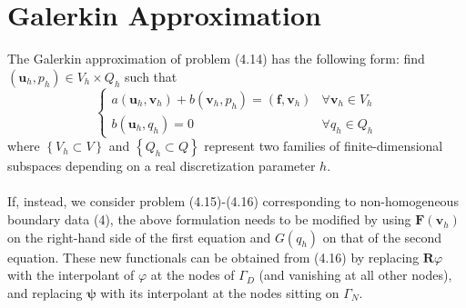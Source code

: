 \documentclass[11pt]{book}
\begin{document}
\section{Galerkin Approximation}
The Galerkin approximation of problem (4.14) has the following form: find $\left(\mathbf{u}_{h}, p_{h}\right) \in V_{h} \times Q_{h}$ such that
\begin{equation}
\begin{cases}a\left(\mathbf{u}_{h}, \mathbf{v}_{h}\right)+b\left(\mathbf{v}_{h}, p_{h}\right)=\left(\mathbf{f}, \mathbf{v}_{h}\right) & \forall \mathbf{v}_{h} \in V_{h} \\ b\left(\mathbf{u}_{h}, q_{h}\right)=0 & \forall q_{h} \in Q_{h}\end{cases}
\end{equation}
where $\left\{V_{h} \subset V\right\}$ and $\left\{Q_{h} \subset Q\right\}$ represent two families of finite-dimensional subspaces depending on a real discretization parameter $h$.\\ \\
If, instead, we consider problem (4.15)-(4.16) corresponding to non-homogeneous boundary data (4), the above formulation needs to be modified by using $\mathbf{F}\left(\mathbf{v}_{h}\right)$ on the right-hand side of the first equation and $G\left(q_{h}\right)$ on that of the second equation. These new functionals can be obtained from (4.16) by replacing $\mathbf{R} \varphi$ with the interpolant of $\varphi$ at the nodes of $\Gamma_{D}$ (and vanishing at all other nodes), and replacing $\boldsymbol{\psi}$ with its interpolant at the nodes sitting on $\Gamma_{N}$.
\end{document}
